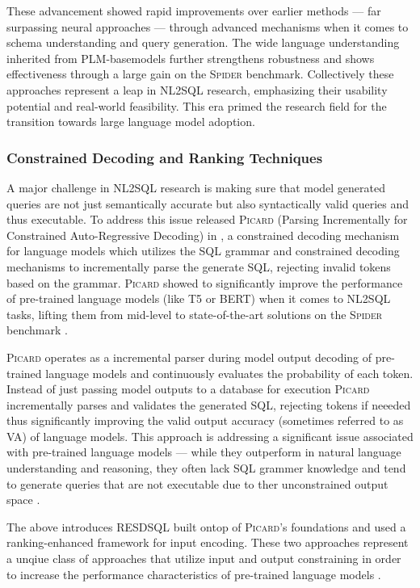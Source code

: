 \documentclass{article}
\begin{document}
These advancement showed rapid improvements over earlier methods — far surpassing neural approaches — through advanced
mechanisms when it comes to schema understanding and query generation. The wide language understanding inherited from
PLM-basemodels further strengthens robustness and shows effectiveness through a large gain on the \textsc{Spider}
benchmark. Collectively these approaches represent a leap in NL2SQL research, emphasizing their usability potential
and real-world feasibility. This era primed the research field for the transition towards large language model adoption.

\subsubsection{Constrained Decoding and Ranking Techniques}

A major challenge in NL2SQL research is making sure that model generated queries are not just semantically accurate
but also syntactically valid queries and thus executable. To address this issue \citeauthor*{PICARD} released \textsc{Picard}
(Parsing Incrementally for Constrained Auto-Regressive Decoding) in \citeyear{PICARD}, a constrained decoding mechanism
for language models which utilizes the SQL grammar and constrained decoding mechanisms to incrementally parse the generate SQL,
rejecting invalid tokens based on the grammar. \textsc{Picard} showed to significantly improve the performance of pre-trained
language models (like T5 or BERT) when it comes to NL2SQL tasks, lifting them from mid-level to state-of-the-art solutions
on the \textsc{Spider} benchmark \citep{PICARD}.

\textsc{Picard} operates as a incremental parser during model output decoding of pre-trained language models and continuously
evaluates the probability of each token. Instead of just passing model outputs to a database for execution \textsc{Picard}
incrementally parses and validates the generated SQL, rejecting tokens if neeeded thus significantly improving the valid
output accuracy (sometimes referred to as VA) of language models. This approach is addressing a significant issue associated
with pre-trained language models — while they outperform in natural language understanding and reasoning, they often lack
SQL grammer knowledge and tend to generate queries that are not executable due to ther unconstrained output space \citep{PICARD}.

The above introduces RESDSQL built ontop of \textsc{Picard}'s foundations and used a ranking-enhanced framework for input
encoding. These two approaches represent a unqiue class of approaches that utilize input and output constraining in order
to increase the performance characteristics of pre-trained language models \citep{RESDSQL}.
\end{document}

